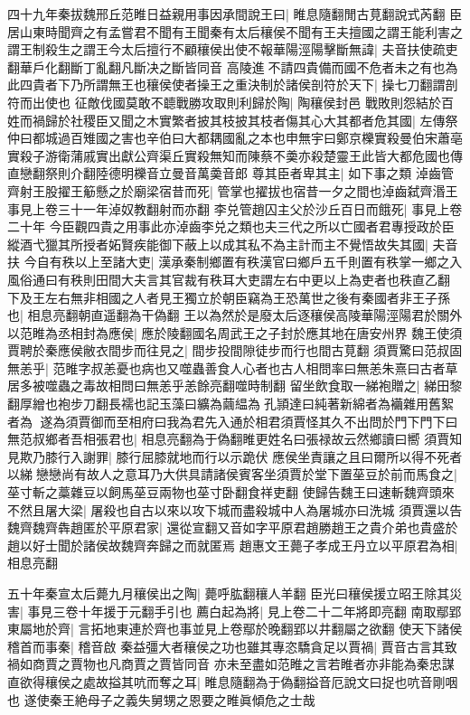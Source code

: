 四十九年秦拔魏邢丘范睢日益親用事因承間說王曰|{
	睢息隨翻閒古莧翻說式芮翻}
臣居山東時聞齊之有孟嘗君不聞有王聞秦有太后穰侯不聞有王夫擅國之謂王能利害之謂王制殺生之謂王今太后擅行不顧穰侯出使不報華陽涇陽擊斷無諱|{
	夫音扶使疏吏翻華戶化翻斷丁亂翻凡斷决之斷皆同音}
高陵進不請四貴備而國不危者未之有也為此四貴者下乃所謂無王也穰侯使者操王之重決制於諸侯剖符於天下|{
	操七刀翻謂剖符而出使也}
征敵伐國莫敢不聼戰勝攻取則利歸於陶|{
	陶穰侯封邑}
戰敗則怨結於百姓而禍歸於社稷臣又聞之木實繁者披其枝披其枝者傷其心大其都者危其國|{
	左傳祭仲曰都城過百雉國之害也辛伯曰大都耦國亂之本也申無宇曰鄭京櫟實殺曼伯宋蕭亳實殺子游衛蒲戚實出獻公齊渠丘實殺無知而陳蔡不羮亦殺楚靈王此皆大都危國也傳直戀翻祭則介翻陸德明櫟音立曼音萬羮音郎}
尊其臣者卑其主|{
	如下事之類}
淖齒管齊射王股擢王䈥懸之於廟梁宿昔而死|{
	管掌也擢拔也宿昔一夕之間也淖齒弑齊湣王事見上卷三十一年淖奴教翻射而亦翻}
李兑管趙囚主父於沙丘百日而餓死|{
	事見上卷二十年}
今臣觀四貴之用事此亦淖齒李兑之類也夫三代之所以亡國者君專授政於臣縱酒弋獵其所授者妬賢疾能御下蔽上以成其私不為主計而主不覺悟故失其國|{
	夫音扶}
今自有秩以上至諸大吏|{
	漢承秦制鄉置有秩漢官曰鄉戶五千則置有秩掌一鄉之入風俗通曰有秩則田間大夫言其官裁有秩耳大吏謂左右中更以上為吏者也秩直乙翻}
下及王左右無非相國之人者見王獨立於朝臣竊為王恐萬世之後有秦國者非王子孫也|{
	相息亮翻朝直遥翻為干偽翻}
王以為然於是廢太后逐穰侯高陵華陽涇陽君於關外以范睢為丞相封為應侯|{
	應於陵翻國名周武王之子封於應其地在唐安州界}
魏王使須賈聘於秦應侯敝衣間步而往見之|{
	間步投間隙徒步而行也間古莧翻}
須賈驚曰范叔固無恙乎|{
	范睢字叔恙憂也病也又噬蟲善食人心者也古人相問率曰無恙朱熹曰古者草居多被噬蟲之毒故相問曰無恙乎恙餘亮翻噬時制翻}
留坐飲食取一綈袍贈之|{
	綈田黎翻厚繒也袍步刀翻長襦也記玉藻曰纊為繭緼為孔頴達曰純著新綿者為襺雜用舊絮者為}
遂為須賈御而至相府曰我為君先入通於相君須賈怪其久不出問於門下門下曰無范叔鄉者吾相張君也|{
	相息亮翻為于偽翻睢更姓名曰張禄故云然鄉讀曰嚮}
須賈知見欺乃膝行入謝罪|{
	膝行屈膝就地而行以示跪伏}
應侯坐責讓之且曰爾所以得不死者以綈戀戀尚有故人之意耳乃大供具請諸侯賓客坐須賈於堂下置莝豆於前而馬食之|{
	莝寸斬之藁雜豆以飼馬莝豆兩物也莝寸卧翻食祥吏翻}
使歸告魏王曰速斬魏齊頭來不然且屠大梁|{
	屠殺也自古以來以攻下城而盡殺城中人為屠城亦曰洗城}
須賈還以告魏齊魏齊犇趙匿於平原君家|{
	還從宣翻又音如字平原君趙勝趙王之貴介弟也貴盛於趙以好士聞於諸侯故魏齊奔歸之而就匿焉}
趙惠文王薨子孝成王丹立以平原君為相|{
	相息亮翻}


五十年秦宣太后薨九月穰侯出之陶|{
	薨呼肱翻穰人羊翻}
臣光曰穰侯援立昭王除其災害|{
	事見三卷十年援于元翻手引也}
薦白起為將|{
	見上卷二十二年將即亮翻}
南取鄢郢東屬地於齊|{
	言拓地東連於齊也事並見上卷鄢於晚翻郢以井翻屬之欲翻}
使天下諸侯稽首而事秦|{
	稽音啟}
秦益彊大者穰侯之功也雖其專恣驕貪足以賈禍|{
	賈音古言其致禍如商賈之賈物也凡商賈之賈皆同音}
亦未至盡如范睢之言若睢者亦非能為秦忠謀直欲得穰侯之處故搤其吭而奪之耳|{
	睢息隨翻為于偽翻搤音厄說文曰捉也吭音剛咽也}
遂使秦王絶母子之義失舅甥之恩要之睢眞傾危之士哉

